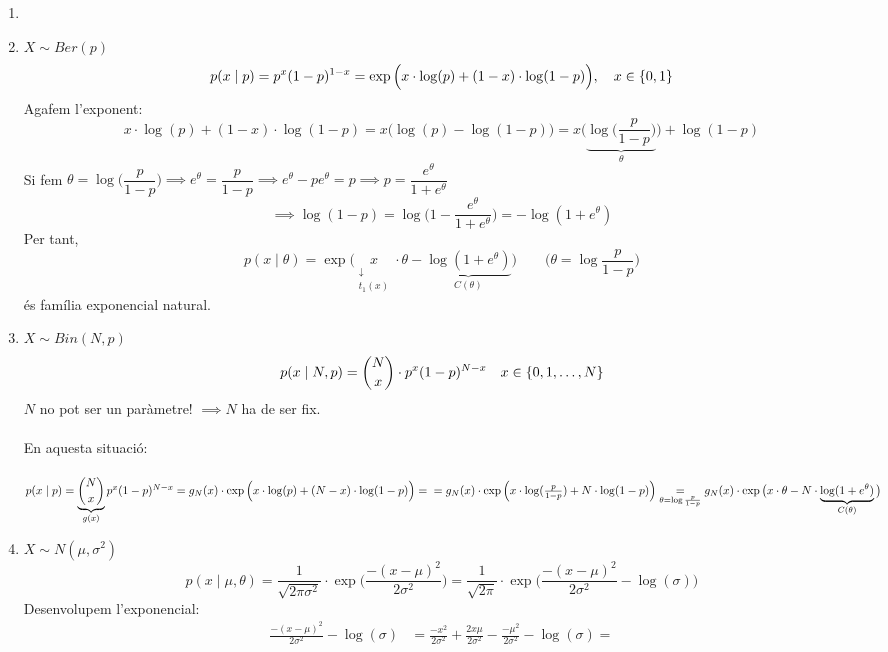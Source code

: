 \begin{example}
  \begin{enumerate}
  \item[]
      \item $X\sim Ber(p)$
      \[
        p(x\mid p) = p^{x}(1-p)^{1-x} = \exp\Big(x\cdot \log(p) + (1-x)\cdot \log(1-p)\Big), \quad x\in\left\{0,1\right\}
      \]
      Agafem l'exponent:
      \[
        x\cdot \log(p) + (1-x)\cdot \log(1-p) = x\Big(\log(p) - \log(1-p)\Big) = 
        x\bigg(\underbrace{\log\Big(\frac{p}{1-p}\Big)}_{\theta} \bigg) + \log(1-p)
      \]
      Si fem $\theta = \log\Big(\dfrac{p}{1-p}\Big) \implies e^{\theta} = \dfrac{p}{1-p} 
      \implies e^{\theta} - pe^{\theta} = p \implies p = \dfrac{e^{\theta}}{1+e^{\theta}}$
      \[
        \implies \log(1-p) = \log\bigg(1-\frac{e^{\theta}}{1+e^{\theta}}\bigg) = -\log(1+e^{\theta})
      \]
      Per tant, 
      \[
        p(x\mid \theta) = \exp\Big(\underset{\substack{\downarrow \\ t_{1}(x)}}{x}\cdot\theta - 
        \underbrace{\log(1+e^{\theta})}_{C(\theta)}\Big) \qquad \bigg(\theta = \log\frac{p}{1-p}\bigg)
      \]
      és família exponencial natural.
      \item $X\sim Bin(N,p)$
      \[
        p(x\mid N,p) = \binom{N}{x}\cdot p^{x}(1-p)^{N-x} \quad x \in \left\{0,1,\ldots,N\right\}
      \]
      $N$ no pot ser un paràmetre! $\implies N$ ha de ser fix. \\\\
      En aquesta situació: \\\\
      $
        p(x\mid p) = \underbrace{\binom{N}{x}}_{g(x)} p^{x}(1-p)^{N-x} = g_{N}(x)\cdot \exp\Big(x\cdot 
        \log(p) + (N-x)\cdot \log(1-p)\Big) = \\=g_{N}(x)\cdot \exp\Big(x\cdot \log(\frac{p}{1-p}) + N\cdot 
        \log(1-p)\Big) \underset{\theta = \log\frac{p}{1-p}}{=}
        g_{N}(x)\cdot \exp\big(x\cdot\theta - N\cdot \underbrace{\log(1+e^{\theta})}_{C(\theta)}\big)
      $
      \item $X\sim N(\mu, \sigma^{2})$
      \[
        p(x\mid \mu, \theta) = \frac{1}{\sqrt{2\pi\sigma^{2}}}\cdot \exp\bigg(\frac{-(x-\mu)^{2}}{2\sigma^{2}}\bigg) = \frac{1}{\sqrt{2\pi}}\cdot \exp\bigg(\frac{-(x-\mu)^{2}}{2\sigma^{2}}-\log(\sigma)\bigg)
      \]
      Desenvolupem l'exponencial:
      \[
      \begin{split}
          \frac{-(x-\mu)^{2}}{2\sigma^{2}}-\log(\sigma) &= \frac{-x^{2}}{2\sigma^{2}}+\frac{2x\mu}{2\sigma^{2}}-\frac{-\mu^{2}}{2\sigma^{2}}-\log(\sigma) = \\

\end{split}\]
\end{enumerate}
\end{example}
